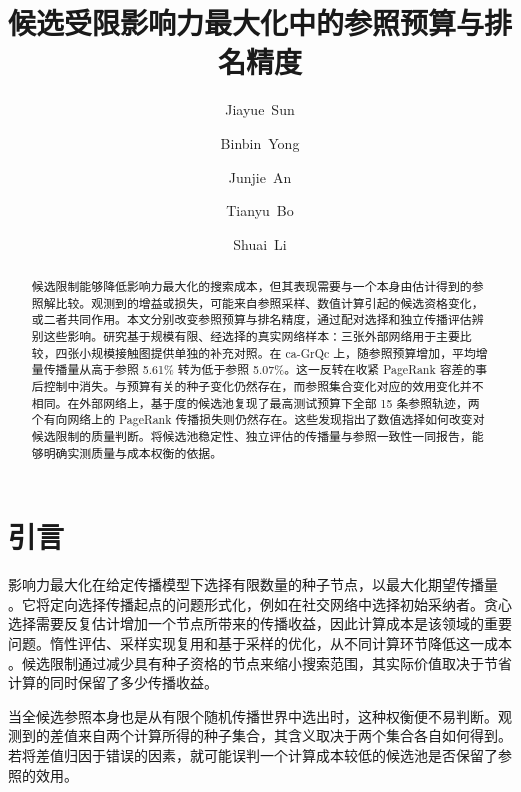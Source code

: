 \documentclass[smallextended]{svjour3}
\begin{document}
\def\abstractname{摘要}\def\keywordname{\textbf{关键词}}\def\figurename{图}\def\tablename{表}\def\refname{参考文献}
\title{候选受限影响力最大化中的参照预算与排名精度}
\author{\mbox{Jiayue Sun} \and \mbox{Binbin Yong} \and \mbox{Junjie An} \and \mbox{Tianyu Bo} \and \mbox{Shuai Li}}
\date{}
\maketitle
\begin{abstract}
候选限制能够降低影响力最大化的搜索成本，但其表现需要与一个本身由估计得到的参照解比较。观测到的增益或损失，可能来自参照采样、数值计算引起的候选资格变化，或二者共同作用。本文分别改变参照预算与排名精度，通过配对选择和独立传播评估辨别这些影响。研究基于规模有限、经选择的真实网络样本：三张外部网络用于主要比较，四张小规模接触图提供单独的补充对照。在 ca-GrQc 上，随参照预算增加，平均增量传播量从高于参照 5.61\% 转为低于参照 5.07\%。这一反转在收紧 PageRank 容差的事后控制中消失。与预算有关的种子变化仍然存在，而参照集合变化对应的效用变化并不相同。在外部网络上，基于度的候选池复现了最高测试预算下全部 15 条参照轨迹，两个有向网络上的 PageRank 传播损失则仍然存在。这些发现指出了数值选择如何改变对候选限制的质量判断。将候选池稳定性、独立评估的传播量与参照一致性一同报告，能够明确实测质量与成本权衡的依据。
\end{abstract}

\section{引言}
影响力最大化在给定传播模型下选择有限数量的种子节点，以最大化期望传播量 \cite{ref1}。它将定向选择传播起点的问题形式化，例如在社交网络中选择初始采纳者。贪心选择需要反复估计增加一个节点所带来的传播收益，因此计算成本是该领域的重要问题。惰性评估、采样实现复用和基于采样的优化，从不同计算环节降低这一成本 \cite{ref7,ref8,ref2}。候选限制通过减少具有种子资格的节点来缩小搜索范围，其实际价值取决于节省计算的同时保留了多少传播收益。

当全候选参照本身也是从有限个随机传播世界中选出时，这种权衡便不易判断。观测到的差值来自两个计算所得的种子集合，其含义取决于两个集合各自如何得到。若将差值归因于错误的因素，就可能误判一个计算成本较低的候选池是否保留了参照的效用。
\end{document}
